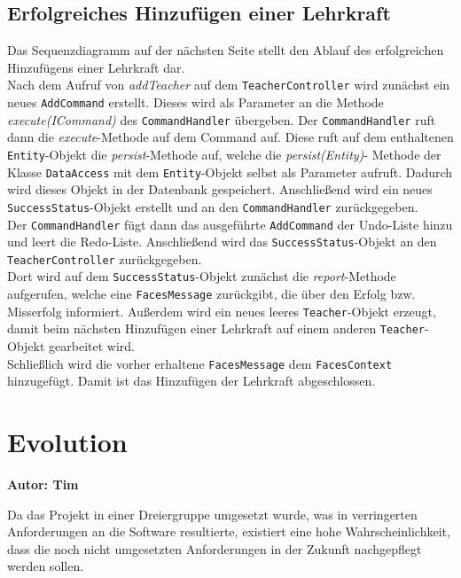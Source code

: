 \documentclass[fontsize=12pt,paper=a4,twoside]{scrartcl}
\begin{document}
\subsection{Erfolgreiches Hinzufügen einer Lehrkraft}
Das Sequenzdiagramm auf der nächsten Seite stellt den Ablauf des erfolgreichen Hinzufügens einer Lehrkraft dar.\\
Nach dem Aufruf von \textit{addTeacher} auf dem \texttt{TeacherController} wird zunächst ein neues \texttt{AddCommand} erstellt. Dieses wird als Parameter an die Methode \textit{execute(ICommand)} des \texttt{CommandHandler} übergeben. Der \texttt{CommandHandler} ruft dann die \textit{execute}-Methode auf dem Command auf. Diese ruft auf dem  enthaltenen \texttt{Entity}-Objekt die \textit{persist}-Methode auf, welche die \textit{persist(Entity)}- Methode der Klasse \texttt{DataAccess} mit dem \texttt{Entity}-Objekt selbst als Parameter aufruft. Dadurch wird dieses Objekt in der Datenbank gespeichert. Anschließend wird ein neues \texttt{SuccessStatus}-Objekt erstellt und an den \texttt{CommandHandler} zurückgegeben.\\
Der \texttt{CommandHandler} fügt dann das ausgeführte \texttt{AddCommand} der Undo-Liste hinzu und leert die Redo-Liste. Anschließend wird das \texttt{SuccessStatus}-Objekt an den \texttt{TeacherController} zurückgegeben.\\
Dort wird auf dem \texttt{SuccessStatus}-Objekt zunächst die \textit{report}-Methode aufgerufen, welche eine \texttt{FacesMessage} zurückgibt, die über den Erfolg bzw. Misserfolg informiert. Außerdem wird ein neues leeres \texttt{Teacher}-Objekt erzeugt, damit beim nächsten Hinzufügen einer Lehrkraft auf einem anderen \texttt{Teacher}-Objekt gearbeitet wird.\\
Schließlich wird die vorher erhaltene \texttt{FacesMessage} dem \texttt{FacesContext} hinzugefügt. Damit ist das Hinzufügen der Lehrkraft abgeschlossen.




\section{Evolution}
\textbf{Autor: Tim}\\ 
\label{sec:evolution}

Da das Projekt in einer Dreiergruppe umgesetzt wurde, was in verringerten Anforderungen an die Software resultierte, existiert eine hohe Wahrscheinlichkeit, dass die noch nicht umgesetzten Anforderungen in der Zukunft nachgepflegt werden sollen.
\end{document}
